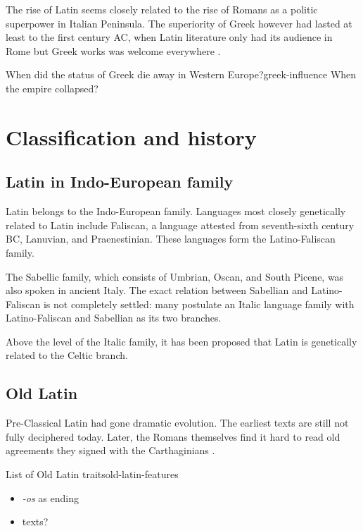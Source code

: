 \documentclass[a4paper, oneside, 12pt]{report}
\newcommand*{\citepage}[1]{p.~{#1}}
\newcommand{\form}[1]{\emph{#1}}
\begin{document}
The rise of Latin seems closely related to the rise of Romans as a politic superpower
in Italian Peninsula.
The superiority of Greek however had lasted at least to the first century AC,
when Latin literature only had its audience in Rome
but Greek works was welcome everywhere
\citep[\citepage{52}]{leonhardt2013latin}. 

\begin{todobox}{When did the status of Greek die away in Western Europe?}{greek-influence}
    When the empire collapsed?
\end{todobox}

\section{Classification and history}

\subsection{Latin in Indo-European family}

Latin belongs to the Indo-European family.
Languages most closely genetically related to Latin include Faliscan,
a language attested from seventh-sixth century BC,
Lanuvian, and Praenestinian.
These languages form the Latino-Faliscan family.

The Sabellic family, which consists of Umbrian, Oscan, and South Picene,
was also spoken in ancient Italy.
The exact relation between Sabellian and Latino-Faliscan is not completely settled:
many postulate an Italic language family
with Latino-Faliscan and Sabellian as its two branches.

Above the level of the Italic family,
it has been proposed that Latin is genetically related to the Celtic branch. 

\subsection{Old Latin}

Pre-Classical Latin had gone dramatic evolution.
The earliest texts are still not fully deciphered today.
Later, the Romans themselves find it hard to read old agreements they signed with the Carthaginians
\citep[\citepage{52}]{leonhardt2013latin}.

\begin{todobox}{List of Old Latin traits}{old-latin-features}
    \begin{itemize}
        \item \form{-os} as ending
        \item texts?
    \end{itemize}
\end{todobox}
\end{document}
